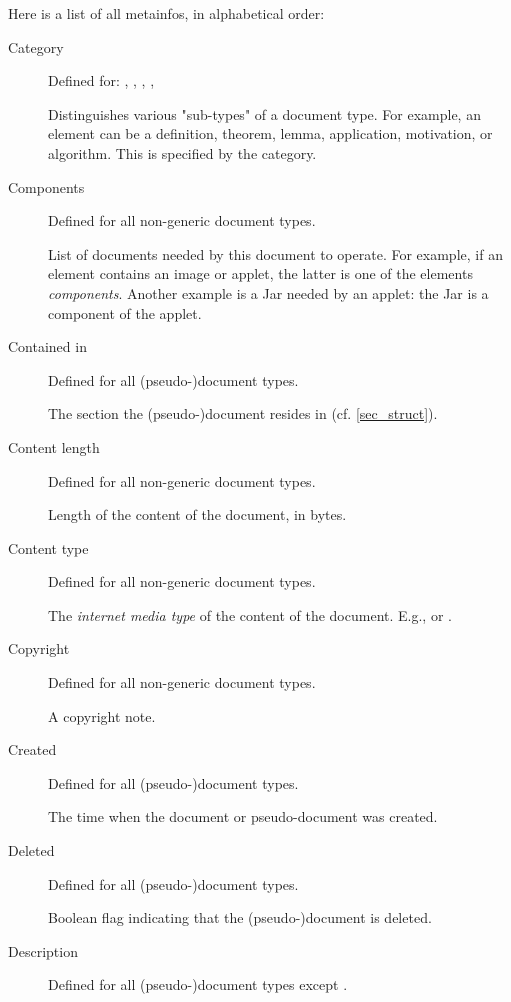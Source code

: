 \documentclass{generic}
\begin{document}
Here is a list of all metainfos, in alphabetical order:

\begin{description}
\item[Category]
  Defined for: , , ,
  , 

  Distinguishes various "sub-types" of a document type. For example, an
  element can be a definition, theorem, lemma, application, motivation, or
  algorithm. This is specified by the category.

\item[Components]
  Defined for all non-generic document types.

  List of documents needed by this document to operate. For example, if an
  element contains an image or applet, the latter is one of the elements
  \emph{components}. Another example is a Jar needed by an applet: the Jar is
  a component of the applet.

\item[Contained in]
  Defined for all (pseudo-)document types.

  The section the (pseudo-)document resides in (cf. \ref{sec_struct}).

\item[Content length]
  Defined for all non-generic document types.

  Length of the content of the document, in bytes.

\item[Content type]
  Defined for all non-generic document types.

  The \emph{internet media type} of the content of the document. E.g.,
   or .

\item[Copyright]
  Defined for all non-generic document types.

  A copyright note.

\item[Created]
  Defined for all (pseudo-)document types.

  The time when the document or pseudo-document was created.

\item[Deleted]
  Defined for all (pseudo-)document types.

  Boolean flag indicating that the (pseudo-)document is deleted.

\item[Description]
  Defined for all (pseudo-)document types except .


\end{description}
\end{document}
